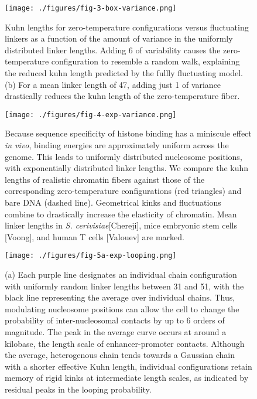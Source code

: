 \documentclass[%
 reprint,
superscriptaddress,
showpacs,preprintnumbers,
 amsmath,amssymb,
 aps,
 prl,
]{revtex4-1}
\begin{document}
\begin{figure}[t]
    \centering
    \texttt{[image: ./figures/fig-3-box-variance.png]}
    \caption{Kuhn lengths for zero-temperature configurations versus
    fluctuating linkers as a function of the amount of variance in the uniformly
    distributed linker lengths.  Adding \SI{6}{\basepair} of variability causes the zero-temperature
    configuration to resemble a random walk, explaining the reduced kuhn
    length predicted by the fullly fluctuating model. (b) For a mean linker
    length of \SI{47}{\basepair}, adding just \SI{1}{\basepair} of variance
    drastically reduces the kuhn length of the zero-temperature fiber.}
\end{figure}
\begin{figure}[t]
    \centering
    \texttt{[image: ./figures/fig-4-exp-variance.png]}
    \caption{Because sequence specificity of histone binding has a miniscule effect
    \textit{in vivo}, binding energies are approximately uniform across the
    genome. This leads to uniformly distributed nucleosome positions, with exponentially distributed linker lengths. We compare
    the kuhn lengths of realistic chromatin fibers against those of the
    corresponding zero-temperature configurations (red
    triangles) and bare
    DNA (dashed line). Geometrical kinks and fluctuations combine to drastically
    increase the elasticity of chromatin. Mean linker lengths in \textit{S.
    cerivisiae}[Chereji], mice embryonic stem cells [Voong], and human T cells
    [Valouev] are marked.}
\end{figure}
\begin{figure}[t]
    \centering
    \texttt{[image: ./figures/fig-5a-exp-looping.png]}
    \caption{(a) Each purple line designates an individual chain configuration
    with uniformly random linker lengths between 31 and \SI{51}{\basepair}, with
    the black line representing the average over individual chains. Thus, modulating nucleosome positions can allow the cell to change
    the probability of inter-nucleosomal contacts by up to 6 orders of
    magnitude. The peak in the average curve occurs at around a kilobase, the
    length scale of enhancer-promoter contacts. Although the average,
    heterogenous chain tends towards a Gaussian chain with a shorter
    effective Kuhn length, individual configurations retain memory of rigid kinks
    at intermediate length scales, as indicated by residual peaks in the looping
    probability.} 
\end{figure}
\end{document}
